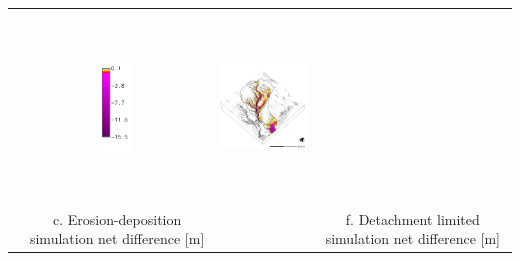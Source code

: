 \documentclass{standalone}
\begin{document}
\begin{tabular}{m{} m{} m{} m{}}
& \multicolumn{1}{c}{\includegraphics[height=25mm]{../../images/ss_flux_3d/legend_difference.png}}
& \multicolumn{1}{c}{\includegraphics[height=50mm]{../../images/ss_flux_3d/difference_carto.png}}\\
\multicolumn{1}{c}{} 
& \multicolumn{1}{c}{c. Erosion-deposition simulation net difference [m]} 
& \multicolumn{1}{c}{} 
& \multicolumn{1}{c}{f. Detachment limited simulation net difference [m]}\\
%
\end{tabular}
\end{document}
